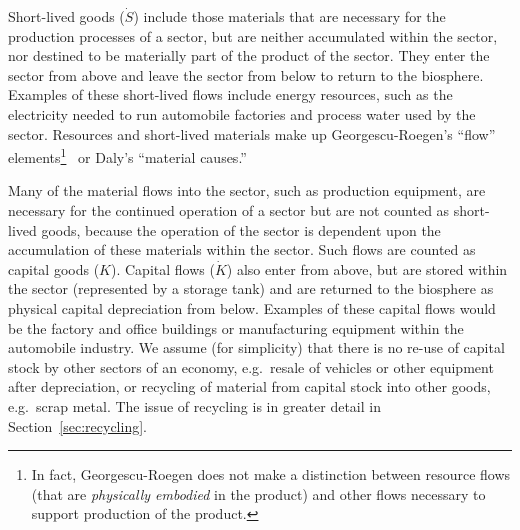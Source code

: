 Short-lived goods ($\dot{S}$)  
include those materials 
that are necessary for the production processes of a sector, 
but are neither accumulated within the sector, 
nor destined to be materially part of the product of the sector. 
They enter the sector from above and leave the sector from
below to return to the biosphere. 
Examples of these short-lived flows include energy resources, such as
the electricity needed to run automobile factories 
and process water used by the sector. 
Resources and short-lived materials make up 
Georgescu-Roegen's ``flow'' elements\footnote{In
fact,
Georgescu-Roegen does not make a distinction between
resource flows (that are \emph{physically embodied}
in the product) and other flows necessary to support production
of the product.
}~\cite{G-R1970} 
or Daly's ``material causes.''~\cite{Daly2006}

Many of the material flows into the sector, 
such as production equipment,
are necessary for the continued operation of a sector 
but are not counted as short-lived goods, 
because the operation of the sector is dependent 
upon the accumulation 
of these materials within the sector. 
Such flows are counted as capital goods 
($K$).
Capital flows ($\dot{K}$) also enter from above, 
but are stored within the sector 
(represented by a storage tank) 
and are returned to the biosphere as 
physical capital depreciation from below.
Examples of these capital flows would be the factory and office buildings or
manufacturing equipment within the automobile industry.
We assume (for simplicity) that there is no re-use of capital stock
by other sectors of an economy,
e.g.\ resale of vehicles or other equipment after depreciation,
or recycling of material from capital stock into other goods,
e.g.\ scrap metal. 
The issue of recycling is in greater detail in
Section~\ref{sec:recycling}.

